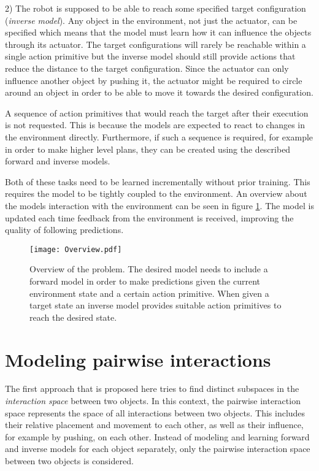 2) The robot is supposed to be able to reach some specified target configuration (\textit{inverse model}). Any object in the environment, not just the actuator, can be specified which means that the model must learn how it can influence the objects through its actuator. The target configurations will rarely be reachable within a single action primitive but the inverse model should still provide actions that reduce the distance to the target configuration. 
Since the actuator can only influence another object by pushing it, the actuator might be required to circle around an object in order to be able to move it towards the desired configuration.

A sequence of action primitives that would reach the target after their execution is not requested. This is because the models are expected to react to changes in the environment directly. Furthermore, if such a sequence is required, for example in order to make higher level plans, they can be created using the described forward and inverse models.

Both of these tasks need to be learned incrementally without prior training. This requires the model to be tightly coupled to the environment. An overview about the models interaction with the environment can be seen in figure \ref{fig:overview}. The model is updated each time feedback from the environment is received, improving the quality of following predictions.

\begin{figure}
	\centering
	\texttt{[image: Overview.pdf]}
	\caption{Overview of the problem. The desired model needs to include a forward model in order to make predictions given the current environment state and a certain action primitive. When given a target state an inverse model provides suitable action primitives to reach the desired state.}
	\label{fig:overview}
\end{figure}

\section{Modeling pairwise interactions \label{sec:pairInt}}

The first approach that is proposed here tries to find distinct subspaces in the \textit{interaction space} between two objects. In this context, the pairwise interaction space represents the space of all interactions between two objects. This includes their relative placement and movement to each other, as well as their influence, for example by pushing, on each other. Instead of modeling and learning forward and inverse models for each object separately, only the pairwise interaction space between two objects is considered. 

